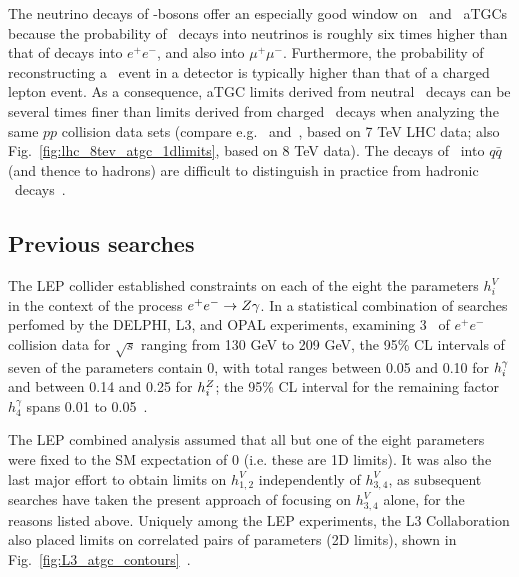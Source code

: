 \documentclass[oneside, letterpaper, 12pt, oldfontcommands]{memoir}
\begin{document}
The neutrino decays of \PZ-bosons offer an especially good window on \PZ\PZ\Pgamma\ and \PZ\Pgamma\Pgamma\ aTGCs because the
probability of \PZ\ decays into neutrinos is roughly six times higher than that of decays into $e^\mathrm{+}e^\mathrm{-}$, and
also into $\mu^\mathrm{+}\mu^\mathrm{-}$. Furthermore, the probability of reconstructing a \zinvg\ event in a detector is typically
higher than that of a charged lepton event. As a consequence, aTGC limits derived from neutral \PZ\ decays can be several times
finer than limits derived from charged \PZ\ decays when analyzing the same $pp$ collision data sets (compare e.g.~\cite{ref:PhysRevD.89.092005} and~\cite{ref:JHEP10(2013)164},
based on 7 TeV LHC data; also Fig.~\ref{fig:lhc_8tev_atgc_1dlimits}, based on 8 TeV data).
The decays of \PZ\ into $q\bar{q}$ (and thence to hadrons) are difficult to distinguish in practice from hadronic \PW\ decays~\cite{ref:RevModPhys.89.035008}.

\subsection{Previous searches} \label{sec:introduction_aTGC_previous_searches}
The LEP collider established constraints on each of the eight the parameters $h_{i}^{V}$ in the context of the process $e^{\mathrm{+}}e^{\mathrm{-}} \to Z\gamma$.
In a statistical combination of searches perfomed by the DELPHI, L3, and OPAL experiments, examining 3 \fbinv\ of $e^{\mathrm{+}}e^{\mathrm{-}}$ collision data
for $\sqrt{s}$ ranging from 130 GeV to 209 GeV, the 95\% CL intervals of seven of the parameters contain 0, with total ranges between 0.05 and 0.10 for $h_{i}^{\gamma}$
and between 0.14 and 0.25 for $h_{i}^{Z}$; the 95\% CL interval for the remaining factor $h_{4}^{\gamma}$ spans 0.01 to 0.05~\cite{ref:j.physrep.2013.07.004}.

The LEP combined analysis assumed that all but one of the eight parameters were fixed to the SM expectation of 0 (i.e. these are 1D limits).
It was also the last major effort to obtain limits on $h_{1,2}^{V}$ independently of $h_{3,4}^{V}$,
as subsequent searches have taken the present approach of focusing on $h_{3,4}^{V}$ alone, for the reasons listed above.
Uniquely among the LEP experiments, the L3 Collaboration also placed limits on correlated pairs of parameters (2D limits), shown in Fig.~\ref{fig:L3_atgc_contours}~\cite{ref:j.physletb.2004.07.002}.
\end{document}
